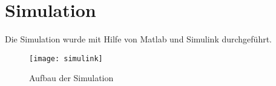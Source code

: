 \section{Simulation}\label{sec:simulation}

Die Simulation wurde mit Hilfe von Matlab und Simulink durchgeführt.

\begin{figure}[h]
  \centering
  \texttt{[image: simulink]}
  \caption{Aufbau der Simulation}
  \label{fig:simulink}
\end{figure}
